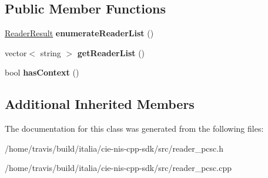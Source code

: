 \subsection*{Public Member Functions}
\begin{DoxyCompactItemize}
\item 
\hypertarget{classnis_1_1implementation_1_1ReaderPCSC_a56fcc4887491509d7ae634f89d18a8d6}{\hyperlink{nis__types_8h_a484156f5b8cf43396c5bbe77226fa8da}{Reader\-Result} {\bfseries enumerate\-Reader\-List} ()}\label{classnis_1_1implementation_1_1ReaderPCSC_a56fcc4887491509d7ae634f89d18a8d6}

\item 
\hypertarget{classnis_1_1implementation_1_1ReaderPCSC_a696551fbfc3e27e5f8ea6f4118540bad}{vector$<$ string $>$ {\bfseries get\-Reader\-List} ()}\label{classnis_1_1implementation_1_1ReaderPCSC_a696551fbfc3e27e5f8ea6f4118540bad}

\item 
\hypertarget{classnis_1_1implementation_1_1ReaderPCSC_a4453deb497839823841ace6698422efa}{bool {\bfseries has\-Context} ()}\label{classnis_1_1implementation_1_1ReaderPCSC_a4453deb497839823841ace6698422efa}

\end{DoxyCompactItemize}
\subsection*{Additional Inherited Members}


The documentation for this class was generated from the following files\-:\begin{DoxyCompactItemize}
\item 
/home/travis/build/italia/cie-\/nis-\/cpp-\/sdk/src/reader\-\_\-pcsc.\-h\item 
/home/travis/build/italia/cie-\/nis-\/cpp-\/sdk/src/reader\-\_\-pcsc.\-cpp\end{DoxyCompactItemize}
